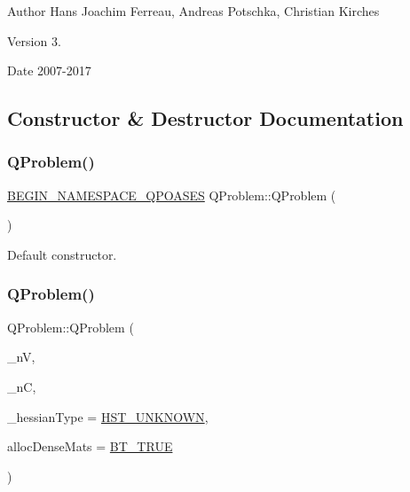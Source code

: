 \begin{DoxyAuthor}{Author}
Hans Joachim Ferreau, Andreas Potschka, Christian Kirches 
\end{DoxyAuthor}
\begin{DoxyVersion}{Version}
3. 
\end{DoxyVersion}
\begin{DoxyDate}{Date}
2007-\/2017 
\end{DoxyDate}


\subsection{Constructor \& Destructor Documentation}
\mbox{\label{class_q_problem_a616f7620819c532d2d58b4c792478d63}} 
\subsubsection{\texorpdfstring{Q\+Problem()}{QProblem()}\hspace{0.1cm}{\footnotesize\ttfamily [1/3]}}
{\footnotesize\ttfamily \hyperlink{_types_8hpp_afd127fcb3c8f47975e9fa0ec2bacde52}{B\+E\+G\+I\+N\+\_\+\+N\+A\+M\+E\+S\+P\+A\+C\+E\+\_\+\+Q\+P\+O\+A\+S\+ES} Q\+Problem\+::\+Q\+Problem (\begin{DoxyParamCaption}{ }\end{DoxyParamCaption})}

Default constructor. \mbox{\label{class_q_problem_a0d1017498dbefdcb10dab87abbf19ef9}} 
\subsubsection{\texorpdfstring{Q\+Problem()}{QProblem()}\hspace{0.1cm}{\footnotesize\ttfamily [2/3]}}
{\footnotesize\ttfamily Q\+Problem\+::\+Q\+Problem (\begin{DoxyParamCaption}\item[{\hyperlink{_types_8hpp_ab6fd6105e64ed14a0c9281326f05e623}{int\+\_\+t}}]{\+\_\+nV,  }\item[{\hyperlink{_types_8hpp_ab6fd6105e64ed14a0c9281326f05e623}{int\+\_\+t}}]{\+\_\+nC,  }\item[{\hyperlink{_types_8hpp_a604cad5cda14e378ce4a77ab28ee9fd9}{Hessian\+Type}}]{\+\_\+hessian\+Type = {\ttfamily \hyperlink{_types_8hpp_a604cad5cda14e378ce4a77ab28ee9fd9a3479cf4e632ae731d4da9bf57a9f8907}{H\+S\+T\+\_\+\+U\+N\+K\+N\+O\+WN}},  }\item[{\hyperlink{_types_8hpp_a20f82124c82b6f5686a7fce454ef9089}{Boolean\+Type}}]{alloc\+Dense\+Mats = {\ttfamily \hyperlink{_types_8hpp_a20f82124c82b6f5686a7fce454ef9089a34c57965bfb07125b09326a69019f9c6}{B\+T\+\_\+\+T\+R\+UE}} }\end{DoxyParamCaption})}

